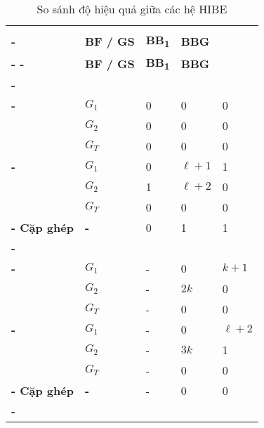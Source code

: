\baselineskip
\begin{longtabu}{| >{\bfseries\centering}p{2.5cm} | >{\bfseries\centering}p{1cm} | X[c] X[c] X[c] |}
	\captionsetup{font=normalsize}
	\caption{So sánh độ hiệu quả giữa các hệ HIBE} \\
	\tabucline[4pt]-
	 		&
	\bfseries BF / GS		 		&
	\bfseries BB\textsubscript{1} 	&
	\bfseries BBG 					\\
	\tabucline[2pt]-
	\endfirsthead
	\tabucline[4pt]-
	 		&
	\bfseries BF / GS		 		&
	\bfseries BB\textsubscript{1} 	&
	\bfseries BBG 					\\
	\tabucline[2pt]-
	\endhead
	 \\
	\tabucline[1pt]-
	& $G_1$ 			& 	0 	& 	0 			& 	0 	\\
	& $G_2$ 			& 	0 	& 	0 			& 	0 	\\
	& $G_T$ 			& 	0 	& 	0 			& 	0 	\\
	\tabucline[1pt]-
	& $G_1$ 			& 	0 	& 	$\ell + 1$ 	& 	1 	\\
	& $G_2$ 			& 	1 	& 	$\ell + 2$ 	& 	0 	\\
	& $G_T$ 			& 	0 	& 	0 			& 	0 	\\
	\tabucline[1pt]-
	Cặp ghép & - 		& 	0 	& 	1 			& 	1 	\\
	\tabucline[2pt]-
	 \\
	\tabucline[1pt]-
	& $G_1$ 			& 	- 	& 	0 		& 	$k + 1$ 	\\
	& $G_2$ 			& 	- 	& 	$2k$ 	& 	0 			\\
	& $G_T$ 			& 	- 	& 	0 		& 	0 			\\
	\tabucline[1pt]-
	& $G_1$ 			& 	- 	& 	0 		& 	$\ell + 2$ 	\\
	& $G_2$ 			& 	- 	& 	$3k$ 	& 	1 			\\
	& $G_T$ 			& 	- 	& 	0 		& 	0 			\\
	\tabucline[1pt]-
	Cặp ghép & - 		& 	- 	& 	0 		& 	0 			\\
	\tabucline[2pt]-
\end{longtabu}
